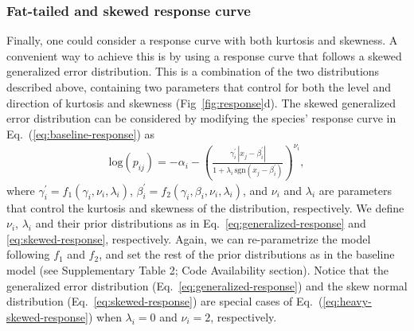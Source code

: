 \documentclass[11pt, a4paper]{article}
\begin{document}
\subsubsection*{Fat-tailed and skewed response curve}
Finally, one could consider a response curve with both kurtosis and skewness. A convenient way to achieve this is by using a response curve that follows a skewed generalized error distribution. This is a combination of the two distributions described above, containing two parameters that control for both the level and direction of kurtosis and skewness (Fig~\ref{fig:response}d). The skewed generalized error distribution can be considered by modifying the species' response curve in Eq.~(\ref{eq:baseline-response}) as
\begin{equation}	
\begin{split}
\text{log}\left(p_{ij}\right) = -\alpha_{i} - \left(\frac{\gamma^{\prime}_{i}\,|x_{j}-\beta^{\prime}_{i}|}{1+\lambda_{i}\,\text{sgn}\left(x_{j}-\beta^{\prime}_{i}\right)}\right)^{\nu_{i}} ,
\end{split}
\label{eq:heavy-skewed-response}
\end{equation}
where $\gamma^{\prime}_{i} = f_{1}\left(\gamma_{i}, \nu_{i}, \lambda_{i}\right)$, $\beta^{\prime}_{i} = f_{2}\left(\gamma_{i}, \beta_{i}, \nu_{i}, \lambda_{i}\right)$, and $\nu_{i}$ and $\lambda_i$ are parameters that control the kurtosis and skewness of the distribution, respectively. We define $\nu_i$, $\lambda_i$ and their prior distributions as in Eq.~\ref{eq:generalized-response} and \ref{eq:skewed-response}, respectively. Again, we can re-parametrize the model following $f_1$ and $f_2$, and set the rest of the prior distributions as in the baseline model (see Supplementary Table 2; Code Availability section). Notice that the generalized error distribution (Eq.~\ref{eq:generalized-response}) and the skew normal distribution (Eq.~\ref{eq:skewed-response}) are special cases of Eq.~(\ref{eq:heavy-skewed-response}) when $\lambda_i=0$ and $\nu_i=2$, respectively.

\end{document}
